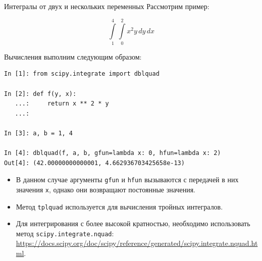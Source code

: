 \documentclass[aspectratio=169, mathserif]{beamer}	%
\begin{document}
\begin{frame}[fragile]{Интегралы от двух и нескольких переменных}
\scriptsize
Рассмотрим пример:	
	
	$$\int\limits_{1}^{4}\int\limits_{0}^{2} x^2y \, dy \, dx$$	
	
Вычисления выполним следующим образом:
\begin{lstlisting}[language=iPython, numbers=none, frame=none, ]
In [1]: from scipy.integrate import dblquad

In [2]: def f(y, x):
   ...:     return x ** 2 * y
   ...:

In [3]: a, b = 1, 4

In [4]: dblquad(f, a, b, gfun=lambda x: 0, hfun=lambda x: 2)
Out[4]: (42.00000000000001, 4.662936703425658e-13)
\end{lstlisting}
\begin{itemize}
	\item В данном случае аргументы \texttt{gfun} и \texttt{hfun} вызываются с передачей в них значения \texttt{x}, однако они возвращают постоянные значения.
	
	\item Метод \texttt{tplquad} используется для вычисления тройных интегралов.
	
	\item Для интегрирования с более высокой кратностью, необходимо использовать метод \texttt{scipy.integrate.nquad}: \url{https://docs.scipy.org/doc/scipy/reference/generated/scipy.integrate.nquad.html}.
\end{itemize}
\vfil
\end{frame}
\end{document}

